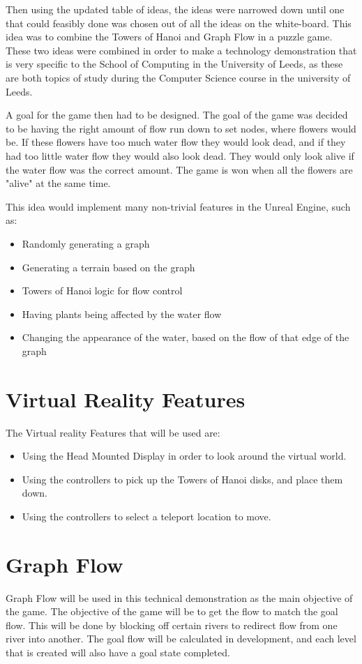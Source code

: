 Then using the updated table of ideas, the ideas were narrowed down until one that could feasibly done was chosen out of all the ideas on the white-board. This idea was to combine the Towers of Hanoi and Graph Flow in a puzzle game. These two ideas were combined in order to make a technology demonstration that is very specific to the School of Computing in the University of Leeds, as these are both topics of study during the Computer Science course in the university of Leeds.
\newline
\par
A goal for the game then had to be designed. The goal of the game was decided to be having the right amount of flow run down to set nodes, where flowers would be. If these flowers have too much water flow they would look dead, and if they had too little water flow they would also look dead. They would only look alive if the water flow was the correct amount. The game is won when all the flowers are "alive" at the same time.
\newline
\par
This idea would implement many non-trivial features in the Unreal Engine, such as:
\begin{itemize}
	\item Randomly generating a graph
	\item Generating a terrain based on the graph
	\item Towers of Hanoi logic for flow control
	\item Having plants being affected by the water flow
	\item Changing the appearance of the water, based on the flow of that edge of the graph
\end{itemize}


\section{Virtual Reality Features}
The Virtual reality Features that will be used are:
\begin{itemize}
	\item Using the Head Mounted Display in order to look around the virtual world.
	\item Using the controllers to pick up the Towers of Hanoi disks, and place them down.
	\item Using the controllers to select a teleport location to move.
\end{itemize}

\section{Graph Flow}
Graph Flow will be used in this technical demonstration as the main objective of the game. The objective of the game will be to get the flow to match the goal flow. This will be done by blocking off certain rivers to redirect flow from one river into another. The goal flow will be calculated in development, and each level that is created will also have a goal state completed.

